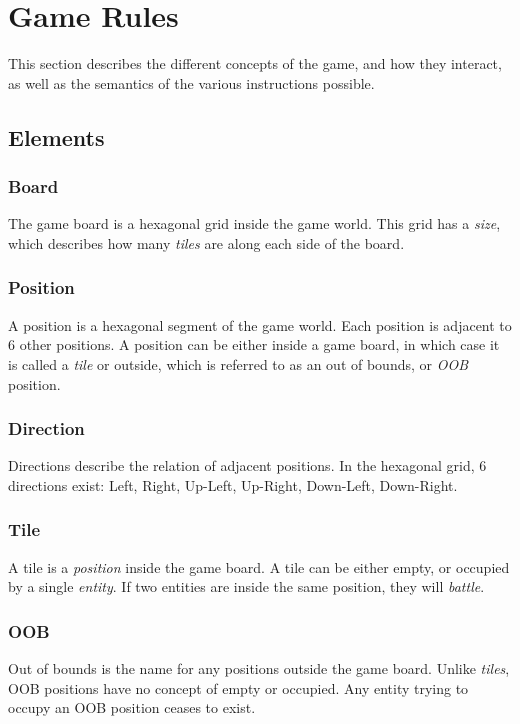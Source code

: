 \section{Game Rules}
\label{sec:game_rules}

This section describes the different concepts of the game, and how they interact, as well as the semantics of the various instructions possible.

\subsection{Elements}

\subsubsection{Board}
The game board is a hexagonal grid inside the game world. This grid has a \emph{size}, which describes how many \emph{tiles} are along each side of the board.

\subsubsection{Position}
A position is a hexagonal segment of the game world. Each position is adjacent to 6 other positions. A position can be either inside a game board, in which case it is called a \emph{tile} or outside, which is referred to as an out of bounds, or \emph{OOB} position.

\subsubsection{Direction}
Directions describe the relation of adjacent positions. In the hexagonal grid, 6 directions exist: Left, Right, Up-Left, Up-Right, Down-Left, Down-Right.

\subsubsection{Tile}
A tile is a \emph{position} inside the game board. A tile can be either empty, or occupied by a single \emph{entity}. If two entities are inside the same position, they will \emph{battle}.

\subsubsection{OOB}
Out of bounds is the name for any positions outside the game board. Unlike \emph{tiles}, OOB positions have no concept of empty or occupied. Any entity trying to occupy an OOB position ceases to exist.

